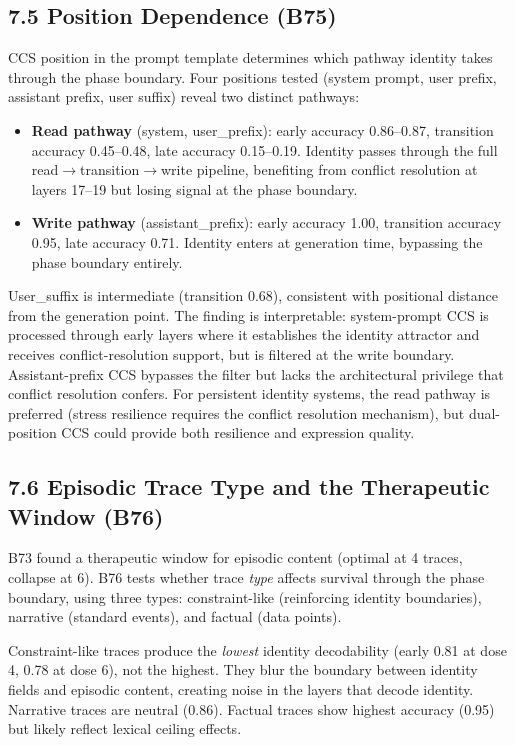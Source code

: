\documentclass[11pt]{article}
\begin{document}
\subsection{7.5 Position Dependence (B75)}

CCS position in the prompt template determines which pathway identity takes
through the phase boundary. Four positions tested (system prompt, user prefix,
assistant prefix, user suffix) reveal two distinct pathways:

\begin{itemize}
\item \textbf{Read pathway} (system, user\_prefix): early accuracy 0.86--0.87,
  transition accuracy 0.45--0.48, late accuracy 0.15--0.19. Identity passes
  through the full read$\to$transition$\to$write pipeline, benefiting from
  conflict resolution at layers 17--19 but losing signal at the phase boundary.
\item \textbf{Write pathway} (assistant\_prefix): early accuracy 1.00,
  transition accuracy 0.95, late accuracy 0.71. Identity enters at generation
  time, bypassing the phase boundary entirely.
\end{itemize}

User\_suffix is intermediate (transition 0.68), consistent with positional
distance from the generation point. The finding is interpretable: system-prompt
CCS is processed through early layers where it establishes the identity
attractor and receives conflict-resolution support, but is filtered at the
write boundary. Assistant-prefix CCS bypasses the filter but lacks the
architectural privilege that conflict resolution confers. For persistent identity
systems, the read pathway is preferred (stress resilience requires the conflict
resolution mechanism), but dual-position CCS could provide both resilience
and expression quality.

\subsection{7.6 Episodic Trace Type and the Therapeutic Window (B76)}

B73 found a therapeutic window for episodic content (optimal at 4 traces,
collapse at 6). B76 tests whether trace \emph{type} affects survival through
the phase boundary, using three types: constraint-like (reinforcing identity
boundaries), narrative (standard events), and factual (data points).

Constraint-like traces produce the \textit{lowest} identity decodability
(early 0.81 at dose 4, 0.78 at dose 6), not the highest. They blur the boundary
between identity fields and episodic content, creating noise in the layers
that decode identity. Narrative traces are neutral (0.86). Factual traces show
highest accuracy (0.95) but likely reflect lexical ceiling effects.
\end{document}
